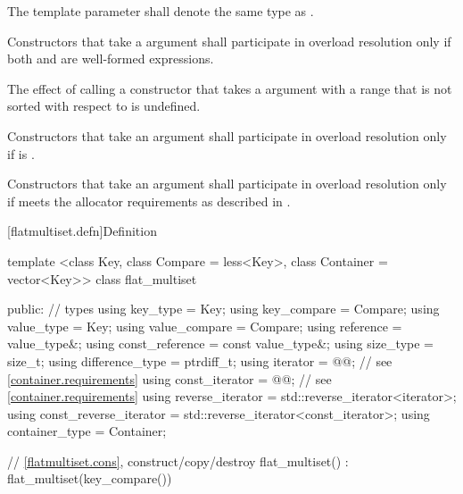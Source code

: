 \begin{codeblock}
\begin{codeblock}
\begin{codeblock}
\begin{addedblock}
\pnum
The template parameter  shall denote the same type as
.

\pnum
Constructors that take a  argument  shall
participate in overload resolution only if both  and
 are well-formed expressions.

\pnum
The effect of calling a constructor that takes a 
argument with a range that is not sorted with respect to  is
undefined.

\pnum
Constructors that take an  argument shall participate in overload
resolution only if  is
.

\pnum
Constructors that take an  argument shall participate in overload
resolution only if  meets the allocator requirements as described
in .

[flatmultiset.defn]{Definition}

\begin{codeblock}
template <class Key, class Compare = less<Key>, class Container = vector<Key>>
class flat_multiset {
  public:
    // types
    using key_type                  = Key;
    using key_compare               = Compare;
    using value_type                = Key;
    using value_compare             = Compare;
    using reference                 = value_type&;
    using const_reference           = const value_type&;
    using size_type                 = size_t;
    using difference_type           = ptrdiff_t;
    using iterator                  = @@; // see \ref{container.requirements}
    using const_iterator            = @@; // see \ref{container.requirements}
    using reverse_iterator          = std::reverse_iterator<iterator>;
    using const_reverse_iterator    = std::reverse_iterator<const_iterator>;
    using container_type            = Container;

    // \ref{flatmultiset.cons}, construct/copy/destroy
    flat_multiset() : flat_multiset(key_compare()) { }

}
\end{codeblock}
\end{addedblock}
\end{codeblock}
\end{codeblock}
\end{codeblock}
